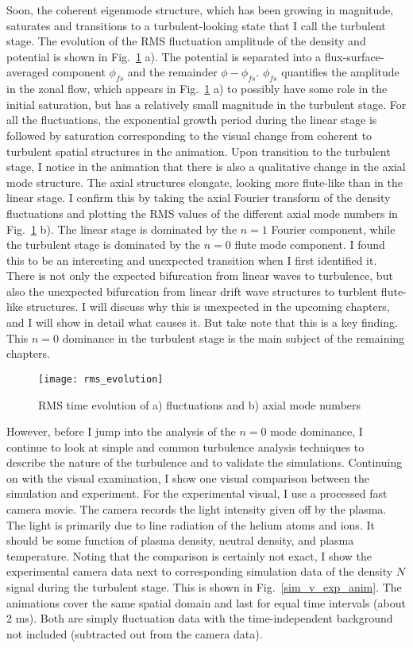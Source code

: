 Soon, the coherent eigenmode structure, which has been growing in magnitude, saturates and transitions to a turbulent-looking state that I call the turbulent stage.
The evolution of the RMS fluctuation amplitude of the density and potential is shown in Fig.~\ref{rms_evolution} a). The potential is separated into a flux-surface-averaged component $\phi_{fs}$
and the remainder $\phi-\phi_{fs}$. $\phi_{fs}$ quantifies the amplitude in the zonal flow, which appears in Fig.~\ref{rms_evolution} a) to possibly have some role in the initial saturation, but
has a relatively small magnitude in the turbulent stage.
For all the fluctuations, the exponential growth period during the linear stage is followed by saturation corresponding to the
visual change from coherent to turbulent spatial structures in the animation. 
Upon transition to the turbulent stage, I notice in the animation that there is also a qualitative change in the axial
mode structure. The axial structures elongate, looking more flute-like than in the linear stage. I confirm this by taking the axial Fourier transform of the density fluctuations and plotting
the RMS values of the different axial mode numbers in Fig.~\ref{rms_evolution} b). The linear stage is dominated by the $n=1$ Fourier component, while the turbulent stage is dominated
by the $n=0$ flute mode component. I found this to be an interesting and unexpected transition when I first identified it. There is not only the expected bifurcation from linear waves to turbulence,
but also the unexpected bifurcation from linear drift wave structures to turblent flute-like structures. I will discuss why this is unexpected in the upcoming chapters, and I will show in detail
what causes it. But take note that this is a key finding. This $n=0$ dominance in the turbulent stage is the main subject of the remaining chapters.


\begin{figure}[!ht]
\centerline{\texttt{[image: rms\_evolution]}}
\caption{RMS time evolution of a) fluctuations and b) axial mode numbers}
\label{rms_evolution}
\end{figure}


However, before I jump into the analysis of the $n=0$ mode dominance, I continue to look at simple and common turbulence analysis techniques to describe the nature of the turbulence
and to validate the simulations.
Continuing on with the visual examination, I show one visual comparison between the simulation and experiment. For the experimental visual, I use a processed
fast camera movie. The camera records the light intensity given off by the plasma. The light is primarily due to line radiation of the helium atoms and ions. It should be some function
of plasma density, neutral density, and plasma temperature. Noting that the comparison is certainly not exact, I show the experimental camera data next to corresponding simulation
data of the density $N$ signal during the turbulent stage. This is shown in Fig.~\ref{sim_v_exp_anim}. 
The animations cover the same spatial domain and last for equal time intervals (about 2 ms). Both are simply fluctuation
data with the time-independent background not included (subtracted out from the camera data). 

